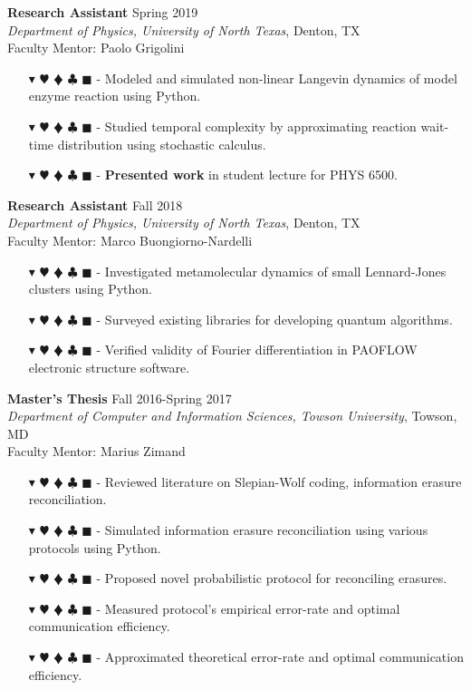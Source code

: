 \documentclass[overlapped, 10pt]{res} %
\newcommand{\physics}{$\blacktriangledown$}
\newcommand{\biochem}{$\varheartsuit$}
\newcommand{\shannon}{$\vardiamondsuit$}
\newcommand{\classic}{$\clubsuit$}
\newcommand{\quantum}{$\blacksquare$}
\newcommand{\physicscolor}{\color{YellowOrange}}
\newcommand{\biochemcolor}{\color{Emerald}}
\newcommand{\shannoncolor}{\color{Goldenrod}}
\newcommand{\classiccolor}{\color{Cyan}}
\newcommand{\quantumcolor}{\color{RedOrange}}
\newcommand{\tag}[1]{
    {\IfSubStr{#1}{\physics}{\physicscolor}{\color{White}}\physics}
    {\IfSubStr{#1}{\biochem}{\biochemcolor}{\color{White}}\biochem}
    {\IfSubStr{#1}{\shannon}{\shannoncolor}{\color{White}}\shannon}
    {\IfSubStr{#1}{\classic}{\classiccolor}{\color{White}}\classic}
    {\IfSubStr{#1}{\quantum}{\quantumcolor}{\color{White}}\quantum}
}
\begin{document}
\begin{resume}
\textbf{Research Assistant} \hfill Spring 2019 \\
\textit{Department of Physics, University of North Texas}, Denton, TX \\
Faculty Mentor: Paolo Grigolini
\begin{itemize} \itemsep -2pt %
\item[\tag{\biochem\classic}-] Modeled and simulated non-linear Langevin dynamics of model enzyme reaction using Python.
\item[\tag{\biochem}-] Studied temporal complexity by approximating reaction wait-time distribution using stochastic calculus.
\item[\tag{}-] \textbf{Presented work} in student lecture for PHYS 6500.
\end{itemize}

\textbf{Research Assistant} \hfill Fall 2018 \\
\textit{Department of Physics, University of North Texas}, Denton, TX \\
Faculty Mentor: Marco Buongiorno-Nardelli
\begin{itemize} \itemsep -2pt %
\item[\tag{\physics\classic}-] Investigated metamolecular dynamics of small Lennard-Jones clusters using Python.
\item[\tag{\quantum}-] Surveyed existing libraries for developing quantum algorithms.
\item[\tag{\physics\classic}-] Verified validity of Fourier differentiation in PAOFLOW electronic structure software.
\end{itemize}

\textbf{Master's Thesis} \hfill Fall 2016-Spring 2017 \\
\textit{Department of Computer and Information Sciences, Towson University}, Towson, MD \\
Faculty Mentor: Marius Zimand
\begin{itemize} \itemsep -2pt %
\item[\tag{\shannon}-] Reviewed literature on Slepian-Wolf coding, information erasure reconciliation.
\item[\tag{\shannon\classic}-] Simulated information erasure reconciliation using various protocols using Python.
\item[\tag{\shannon\classic}-] Proposed novel probabilistic protocol for reconciling erasures.
\item[\tag{\shannon\classic}-] Measured protocol's empirical error-rate and optimal communication efficiency.
\item[\tag{\shannon}-] Approximated theoretical error-rate and optimal communication efficiency.
\end{itemize}


\end{resume}
\end{document}
